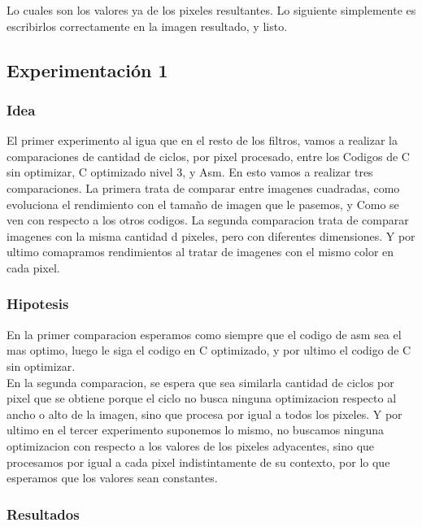 	Lo cuales son los valores ya de los pixeles resultantes. Lo siguiente simplemente es escribirlos correctamente en la imagen resultado, y listo.



	
\subsection{Experimentación 1}

\subsubsection{Idea}
	El primer experimento al igua que en el resto de los filtros, vamos a realizar la comparaciones 
	de cantidad de ciclos, por pixel procesado,  entre los Codigos de C sin optimizar, C optimizado nivel 3, y Asm. En esto vamos a realizar tres comparaciones. La primera trata de comparar entre imagenes cuadradas, como evoluciona el rendimiento con el tamaño de imagen que le pasemos, y Como se ven con respecto a los otros codigos. La segunda comparacion trata de comparar imagenes con la misma cantidad d pixeles, pero con diferentes dimensiones. Y por ultimo comapramos rendimientos al tratar de imagenes con el mismo color en cada pixel.
	
	
\subsubsection{Hipotesis}
	En la primer comparacion esperamos como siempre que el codigo de asm sea el mas optimo, luego le siga el codigo en C optimizado, y por ultimo el codigo de C sin optimizar. \\ 
	En la segunda comparacion, se espera que sea similarla cantidad de ciclos por pixel que se obtiene porque el ciclo no busca ninguna optimizacion respecto al ancho o alto de la imagen, sino que procesa por igual a todos los pixeles.
	Y por ultimo en el tercer experimento suponemos lo mismo, no buscamos ninguna optimizacion con respecto a los valores de los pixeles adyacentes, sino que procesamos por igual a cada pixel indistintamente de su contexto, por lo que esperamos que los valores sean constantes.
	

\subsubsection{Resultados}

